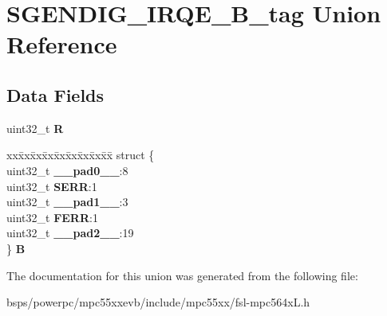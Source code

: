 \hypertarget{unionSGENDIG__IRQE__32B__tag}{}\section{S\+G\+E\+N\+D\+I\+G\+\_\+\+I\+R\+Q\+E\+\_\+B\+\_\+tag Union Reference}
\label{unionSGENDIG__IRQE__32B__tag}
\subsection*{Data Fields}
\begin{DoxyCompactItemize}
\item 
\mbox{\label{unionSGENDIG__IRQE__32B__tag_ab2ab2b631dccce735b332bed57b547d6}} 
uint32\+\_\+t {\bfseries R}
\item 
\mbox{\label{unionSGENDIG__IRQE__32B__tag_adf91c442208d140c2e5047dc47ee3ab2}} 
\begin{tabbing}
xx\=xx\=xx\=xx\=xx\=xx\=xx\=xx\=xx\=\kill
struct \{\\
\>uint32\_t {\bfseries \_\_pad0\_\_}:8\\
\>uint32\_t {\bfseries SERR}:1\\
\>uint32\_t {\bfseries \_\_pad1\_\_}:3\\
\>uint32\_t {\bfseries FERR}:1\\
\>uint32\_t {\bfseries \_\_pad2\_\_}:19\\
\} {\bfseries B}\\

\end{tabbing}\end{DoxyCompactItemize}


The documentation for this union was generated from the following file\+:\begin{DoxyCompactItemize}
\item 
bsps/powerpc/mpc55xxevb/include/mpc55xx/fsl-\/mpc564x\+L.\+h\end{DoxyCompactItemize}
